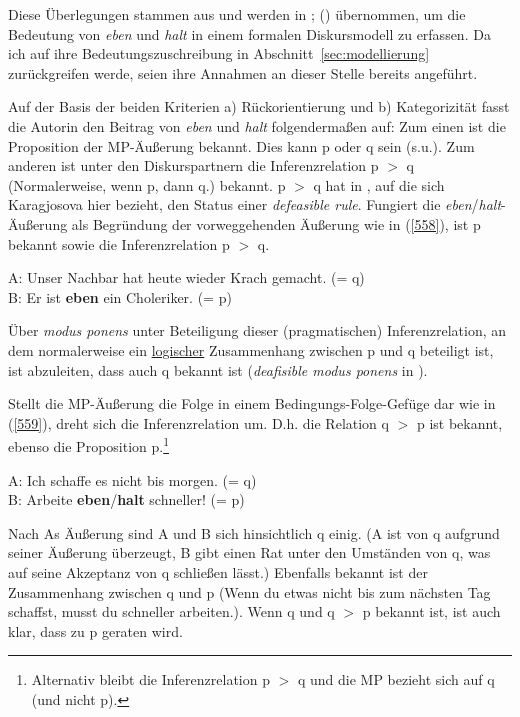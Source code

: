 Diese Überlegungen stammen aus \citet[98-101]{Dahl1988} und werden in \citet[340]{Karagjosova2003}; (\citeyear[202-220]{Karagjosova2004}) übernommen, um die Bedeutung von \textit{eben} und \textit{halt} in einem formalen Diskursmodell zu erfassen. Da ich auf ihre Bedeutungszuschreibung in Abschnitt~\ref{sec:modellierung} zurückgreifen werde, seien ihre Annahmen an dieser Stelle bereits angeführt.

Auf der Basis der beiden Kriterien a) Rückorientierung und b) Kategorizität fasst die Autorin den Beitrag von \textit{eben} und \textit{halt} folgendermaßen auf: Zum einen ist die Proposition der MP-Äußerung bekannt. Dies kann p oder q sein (s.u.). Zum anderen ist unter den Diskurspartnern die Inferenzrelation p $>$ q (\glq Normalerweise, wenn p, dann q.\grq {}) bekannt. p $>$ q hat in \citet{Asher1991}, auf die sich Karagjosova hier bezieht, den Status  einer \textit{defeasible rule}. Fungiert die \textit{eben}/\textit{halt}-Äußerung als Begründung der vorweggehenden Äußerung wie in (\ref{558}), ist p bekannt sowie die Inferenzrelation p $>$ q.
\begin{exe}
	\ex\label{558} 
	A: Unser Nachbar hat heute wieder Krach gemacht. (= q)\\
	B: Er ist \textbf{eben} ein Choleriker. (= p)
\end{exe}
Über \textit{modus ponens}  unter Beteiligung dieser (pragmatischen) Inferenzrelation, an dem nor\-malerweise ein \underline{logischer} Zusammenhang zwischen p und q beteiligt ist, ist abzuleiten, dass auch q bekannt ist (\textit{deafisible modus ponens}  in \citealt[387]{Asher1991}). 

Stellt die MP-Äußerung die Folge in einem Bedingungs-Folge-Gefüge dar wie in (\ref{559}), dreht sich die Inferenzrelation um. D.h. die Relation q $>$ p ist bekannt, ebenso die Proposition p.\footnote{Alternativ bleibt die Inferenzrelation p $>$ q und die MP bezieht sich auf q (und nicht p).}

\begin{exe}
	\ex\label{559} 
	A: Ich schaffe es nicht bis morgen. (= q)\\
	B: Arbeite \textbf{eben}/\textbf{halt} schneller! (= p)
\end{exe}	
Nach As Äußerung sind A und B sich hinsichtlich q einig. (A ist von q aufgrund seiner Äußerung überzeugt, B gibt einen Rat unter den Umständen von q, was auf seine Akzeptanz von q schließen lässt.) Ebenfalls bekannt ist der Zusammenhang zwischen q und p (\glq Wenn du etwas nicht bis zum nächsten Tag schaffst, musst du schneller arbeiten.\grq {}). Wenn q und q $>$ p bekannt ist, ist auch klar, dass zu p geraten wird.

